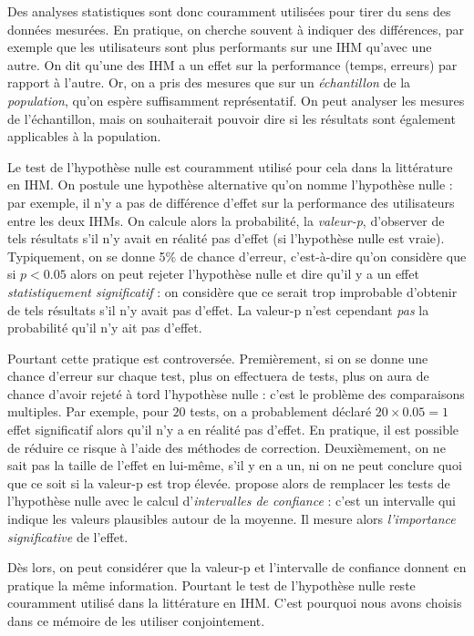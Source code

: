 Des analyses statistiques sont donc couramment utilisées pour tirer du sens des données mesurées. En pratique, on cherche souvent à indiquer des différences, par exemple que les utilisateurs sont plus performants sur une IHM qu'avec une autre. On dit qu'une des IHM a un effet sur la performance (temps, erreurs) par rapport à l'autre. Or, on a pris des mesures que sur un \emph{échantillon} de la \emph{population}, qu'on espère suffisamment représentatif. On peut analyser les mesures de l'échantillon, mais on souhaiterait pouvoir dire si les résultats sont également applicables à la population.

Le test de l'hypothèse nulle est couramment utilisé pour cela dans la littérature en IHM. On postule une hypothèse alternative qu'on nomme l'hypothèse nulle : par exemple, il n'y a pas de différence d'effet sur la performance des utilisateurs entre les deux IHMs. On calcule alors la probabilité, la \emph{valeur-p}, d'observer de tels résultats s'il n'y avait en réalité pas d'effet (si l'hypothèse nulle est vraie). Typiquement, on se donne 5\% de chance d'erreur, c'est-à-dire qu'on considère que si $p < 0.05$ alors on peut rejeter l'hypothèse nulle et dire qu'il y a un effet \emph{statistiquement significatif} : on considère que ce serait trop improbable d'obtenir de tels résultats s'il n'y avait pas d'effet. La valeur-p n'est cependant \emph{pas} la probabilité qu'il n'y ait pas d'effet.

Pourtant cette pratique est controversée. Premièrement, si on se donne une chance d'erreur sur chaque test, plus on effectuera de tests, plus on aura de chance d'avoir rejeté à tord l'hypothèse nulle : c'est le problème des comparaisons multiples. Par exemple, pour $20$ tests, on a probablement déclaré $20 \times 0.05 = 1$ effet significatif alors qu'il n'y a en réalité pas d'effet. En pratique, il est possible de réduire ce risque à l'aide des méthodes de correction. Deuxièmement, on ne sait pas la taille de l'effet en lui-même, s'il y en a un, ni on ne peut conclure quoi que ce soit si la valeur-p est trop élevée. \cite{Dragicevic2016} propose alors de remplacer les tests de l'hypothèse nulle avec le calcul d'\emph{intervalles de confiance} : c'est un intervalle qui indique les valeurs plausibles autour de la moyenne. Il mesure alors \emph{l'importance significative} de l'effet.

Dès lors, on peut considérer que la valeur-p et l'intervalle de confiance donnent en pratique la même information. Pourtant le test de l'hypothèse nulle reste couramment utilisé dans la littérature en IHM. C'est pourquoi nous avons choisis dans ce mémoire de les utiliser conjointement.

